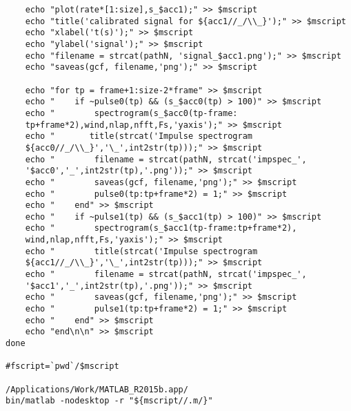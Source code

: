 \documentclass{sigchi}
\begin{document}
\begin{lstlisting}
	echo "plot(rate*[1:size],s_$acc1);" >> $mscript
	echo "title('calibrated signal for ${acc1//_/\\_}');" >> $mscript
	echo "xlabel('t(s)');" >> $mscript
	echo "ylabel('signal');" >> $mscript
	echo "filename = strcat(pathN, 'signal_$acc1.png');" >> $mscript
	echo "saveas(gcf, filename,'png');" >> $mscript

	echo "for tp = frame+1:size-2*frame" >> $mscript
	echo "    if ~pulse0(tp) && (s_$acc0(tp) > 100)" >> $mscript
	echo "        spectrogram(s_$acc0(tp-frame:
    tp+frame*2),wind,nlap,nfft,Fs,'yaxis');" >> $mscript
 	echo "       title(strcat('Impulse spectrogram 
    ${acc0//_/\\_}','\_',int2str(tp)));" >> $mscript
	echo "        filename = strcat(pathN, strcat('impspec_',
    '$acc0','_',int2str(tp),'.png'));" >> $mscript
	echo "        saveas(gcf, filename,'png');" >> $mscript
	echo "        pulse0(tp:tp+frame*2) = 1;" >> $mscript
	echo "    end" >> $mscript
	echo "    if ~pulse1(tp) && (s_$acc1(tp) > 100)" >> $mscript
	echo "        spectrogram(s_$acc1(tp-frame:tp+frame*2),
    wind,nlap,nfft,Fs,'yaxis');" >> $mscript
	echo "        title(strcat('Impulse spectrogram 
    ${acc1//_/\\_}','\_',int2str(tp)));" >> $mscript
	echo "        filename = strcat(pathN, strcat('impspec_',
    '$acc1','_',int2str(tp),'.png'));" >> $mscript
	echo "        saveas(gcf, filename,'png');" >> $mscript
	echo "        pulse1(tp:tp+frame*2) = 1;" >> $mscript
	echo "    end" >> $mscript
	echo "end\n\n" >> $mscript
done

#fscript=`pwd`/$mscript

/Applications/Work/MATLAB_R2015b.app/
bin/matlab -nodesktop -r "${mscript//.m/}"
\end{lstlisting}
\end{document}
